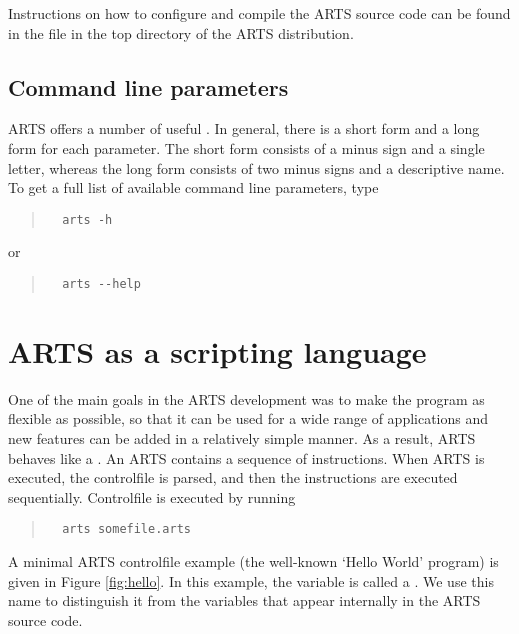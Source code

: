 Instructions on how to configure and compile the ARTS source code can
be found in the file  in the top directory of the
ARTS distribution.

\subsection{Command line parameters}

ARTS offers a number of useful . In
general, there is a short form and a long form for each parameter. The
short form consists of a minus sign and a single letter, whereas the
long form consists of two minus signs and a descriptive name. To get a
full list of available command line parameters, type
\begin{quote}
\begin{verbatim}
  arts -h
\end{verbatim}
\end{quote}
or
\begin{quote}
\begin{verbatim}
  arts --help
\end{verbatim}
\end{quote}

\section{ARTS as a scripting language}

One of the main goals in the ARTS development was to make the program
as flexible as possible, so that it can be used for a wide range of
applications and new features can be added in a relatively simple
manner. As a result, ARTS behaves like a . An ARTS  contains a sequence of
instructions. When ARTS is executed, the controlfile is parsed, and
then the instructions are executed sequentially. Controlfile
 is executed by running
\begin{quote}
\begin{verbatim}
  arts somefile.arts
\end{verbatim}
\end{quote}

A minimal ARTS controlfile example (the well-known `Hello World' program) is
given in Figure \ref{fig:hello}. In this example, the variable  is
called a \emph{}. We use this name to distinguish it from the
variables that appear internally in the ARTS source code.

